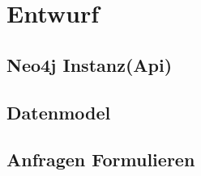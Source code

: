 \section{Entwurf}\label{entwurf}
\subsection{Neo4j Instanz(Api)}
\subsection{Datenmodel}
\subsection{Anfragen Formulieren}
\subsection{}
